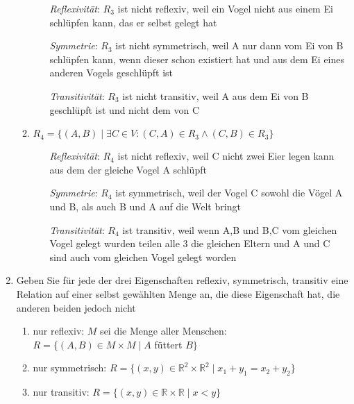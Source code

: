 \documentclass{alex_hü}
\begin{document}
\begin{enumerate}
\begin{enumerate}
				\begin{itemize}[leftmargin=2.5cm,labelsep=0.25cm]
					\item[\textit{Reflexivität}:] $R_{3}$ ist nicht reflexiv, weil ein Vogel nicht aus einem Ei schlüpfen kann, das er selbst gelegt hat\\
					\item[\textit{Symmetrie}:] $R_{3}$ ist nicht symmetrisch, weil A nur dann vom Ei von B schlüpfen kann, wenn dieser schon existiert hat und aus dem Ei eines anderen Vogels geschlüpft ist \\
					\item[\textit{Transitivität}:] $R_{3}$ ist nicht transitiv, weil A aus dem Ei von B geschlüpft ist und nicht dem von C\\
				\end{itemize}
				\item $R_{4} = \{(A, B) \mid \exists C \in V \colon (C,A) \in R_{3} \land (C,B) \in R_{3}\}$ \\
				\begin{itemize}[leftmargin=2.5cm,labelsep=0.25cm]
					\item[\textit{Reflexivität}:] $R_{4}$ ist nicht reflexiv, weil C nicht zwei Eier legen kann aus dem der gleiche Vogel A schlüpft\\
					\item[\textit{Symmetrie}:] $R_{4}$ ist symmetrisch, weil der Vogel C sowohl die Vögel A und B, als auch B und A auf die Welt bringt\\
					\item[\textit{Transitivität}:] $R_{4}$ ist transitiv, weil wenn A,B und B,C vom gleichen Vogel gelegt wurden teilen alle 3 die gleichen Eltern und A und C sind auch vom gleichen Vogel gelegt worden \\
				\end{itemize}
			\end{enumerate}
		\item Geben Sie für jede der drei Eigenschaften reflexiv, symmetrisch, transitiv eine
		Relation auf einer selbst gewählten Menge an, die diese Eigenschaft hat, die anderen
		beiden jedoch nicht \\
		\begin{enumerate}
			\item nur reflexiv: $M$ sei die Menge aller Menschen:\\
			$R = \{(A, B) \in M \times M \mid A$ füttert $B\}$\\
			\item nur symmetrisch: $R = \{(x, y) \in \mathbb{R}^{2} \times \mathbb{R}^{2} \mid x_1 + y_1 = x_2 + y_2\}$ \\
			\item nur transitiv:  $R = \{(x, y) \in \mathbb{R} \times \mathbb{R} \mid x < y\}$ \\
		\end{enumerate}
	\end{enumerate}
	
\end{document}
